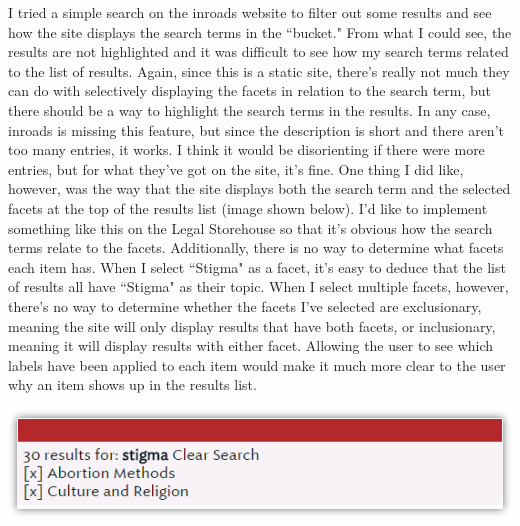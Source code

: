 \documentclass{article}
\begin{document}
I tried a simple search on the inroads website to filter out some results and see how the site displays the search terms in the ``bucket." From what I could see, the results are not highlighted and it was difficult to see how my search terms related to the list of results. Again, since this is a static site, there's really not much they can do with selectively displaying the facets in relation to the search term, but there should be a way to highlight the search terms in the results. In any case, inroads is missing this feature, but since the description is short and there aren't too many entries, it works. I think it would be disorienting if there were more entries, but for what they've got on the site, it's fine. One thing I did like, however, was the way that the site displays both the search term and the selected facets at the top of the results list (image shown below). I'd like to implement something like this on the Legal Storehouse so that it's obvious how the search terms relate to the facets. Additionally, there is no way to determine what facets each item has. When I select ``Stigma" as a facet, it's easy to deduce that the list of results all have ``Stigma" as their topic. When I select multiple facets, however, there's no way to determine whether the facets I've selected are exclusionary, meaning the site will only display results that have both facets, or inclusionary, meaning it will display results with either facet. Allowing the user to see which labels have been applied to each item would make it much more clear to the user why an item shows up in the results list.

\noindent\includegraphics[width=\textwidth]{2016-07-15-inroads-facets}
\end{document}
